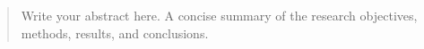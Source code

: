 \begin{abstract}
Write your abstract here. A concise summary of the research objectives, methods, results, and conclusions.
\end{abstract}

